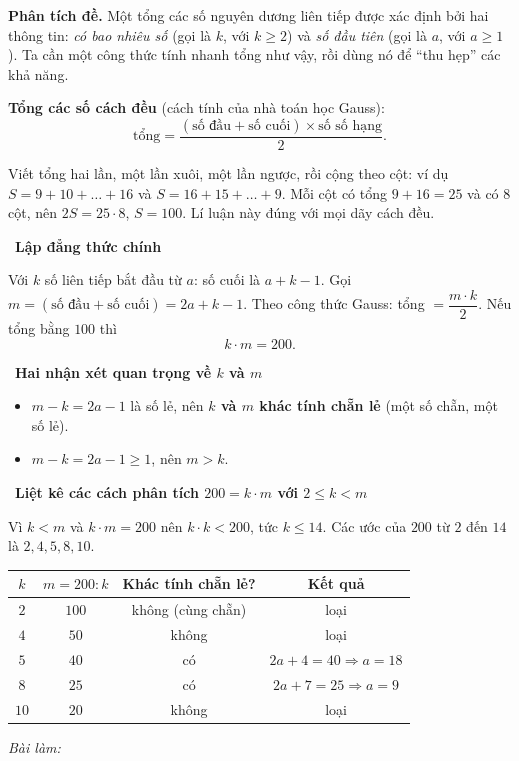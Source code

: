 \documentclass[11pt]{article}
\newif\ifsol \solfalse
\newcommand{\StuProb}[2]{\begin{probboxS}{#1}{#2}\StuProbBody\end{probboxS}}
\newcommand{\probsol}[1]{%
  \begin{lrbox}{\solmeasure}\begin{minipage}{\dimexpr\linewidth-24pt\relax}#1\end{minipage}\end{lrbox}%
  \ifsol
    \begin{solbox}#1\end{solbox}%
  \else
    \setlength{\solht}{\dimexpr\ht\solmeasure+\dp\solmeasure+0.85cm\relax}%
    \ifdim\solht<1.35cm\setlength{\solht}{1.35cm}\fi
    \ifdim\solht>\StudentMaxWork\setlength{\solht}{\StudentMaxWork}\fi
    \par\noindent\begin{minipage}{\linewidth}%
    \expandafter\StuProb\StuProbArgs
    \begin{tcolorbox}[colback=white,colframe=Line,boxrule=0.8pt,arc=5pt,
      left=8pt,right=8pt,top=4pt,bottom=4pt,height=\solht]{\footnotesize\color{Slate}\itshape\WorkWord}\end{tcolorbox}%
    \end{minipage}\par\medskip
  \fi}
\newlength{\StudentMaxWork}\setlength{\StudentMaxWork}{4.5cm}
\newcommand{\step}[2]{\par\smallskip\noindent{\bfseries\color{tmBlue!85!black}\StepWord~#1.}\ {\bfseries #2}\par\nopagebreak}
\def\WorkWord{Bài làm:}
\def\StepWord{Bước}
\begin{document}
\probsol{
\textbf{Phân tích đề.} Một tổng các số nguyên dương liên tiếp được xác định bởi hai thông tin: \emph{có bao nhiêu số} (gọi là $k$, với $k\ge 2$) và \emph{số đầu tiên} (gọi là $a$, với $a\ge 1$). Ta cần một công thức tính nhanh tổng như vậy, rồi dùng nó để ``thu hẹp'' các khả năng.

\begin{recallbox}\textbf{Tổng các số cách đều} (cách tính của nhà toán học Gauss):\[\text{tổng}=\frac{(\text{số đầu}+\text{số cuối})\times\text{số số hạng}}{2}.\]\end{recallbox}

\begin{proofbox}Viết tổng hai lần, một lần xuôi, một lần ngược, rồi cộng theo cột: ví dụ $S=9+10+\dots+16$ và $S=16+15+\dots+9$. Mỗi cột có tổng $9+16=25$ và có $8$ cột, nên $2S=25\cdot 8$, $S=100$. Lí luận này đúng với mọi dãy cách đều.\end{proofbox}

\step{1}{Lập đẳng thức chính}
Với $k$ số liên tiếp bắt đầu từ $a$: số cuối là $a+k-1$. Gọi $m=(\text{số đầu}+\text{số cuối})=2a+k-1$. Theo công thức Gauss: tổng $=\dfrac{m\cdot k}{2}$. Nếu tổng bằng $100$ thì
\[k\cdot m=200.\]

\step{2}{Hai nhận xét quan trọng về $k$ và $m$}
\begin{itemize}[leftmargin=1.4em,itemsep=1pt]
\item $m-k=2a-1$ là số lẻ, nên \textbf{$k$ và $m$ khác tính chẵn lẻ} (một số chẵn, một số lẻ).
\item $m-k=2a-1\ge 1$, nên \textbf{$m>k$}.
\end{itemize}

\step{3}{Liệt kê các cách phân tích $200=k\cdot m$ với $2\le k<m$}
Vì $k<m$ và $k\cdot m=200$ nên $k\cdot k<200$, tức $k\le 14$. Các ước của $200$ từ $2$ đến $14$ là $2,4,5,8,10$.
\begin{center}
\begin{tabular}{|c|c|c|c|}
\hline
\rowcolor{Tint}$k$ & $m=200:k$ & Khác tính chẵn lẻ? & Kết quả\\
\hline
$2$ & $100$ & không (cùng chẵn) & loại\\
$4$ & $50$ & không & loại\\
$5$ & $40$ & có & $2a+4=40\Rightarrow a=18$\\
$8$ & $25$ & có & $2a+7=25\Rightarrow a=9$\\
$10$ & $20$ & không & loại\\
\hline
\end{tabular}
\end{center}

}
\end{document}
